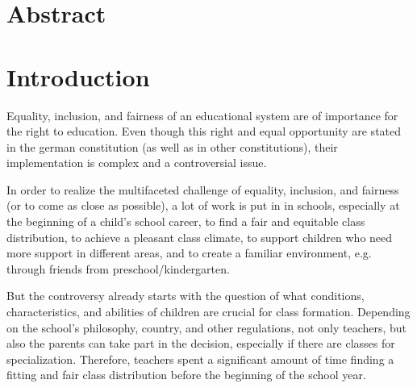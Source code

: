 






\newpage
\begin{onehalfspace}

\section*{Abstract}
\newpage
\section{Introduction}
Equality, inclusion, and fairness of an educational system are of importance 
for the right to education. Even though this right and equal opportunity are 
stated in the german constitution (as well as in other constitutions), their 
implementation is complex and a controversial issue. \citep{zhang2014equality}

In order to realize the multifaceted challenge of equality, inclusion, and fairness
 (or to come as close as possible), a lot of work is put in in schools, especially at 
 the beginning of a child's school career, to find a fair and equitable class distribution,
  to achieve a pleasant class climate, to support children who need more support in different areas, 
  and to create a familiar environment, e.g. through friends from preschool/kindergarten.

But the controversy already starts with the question of what conditions, characteristics, 
and abilities of children are crucial for class formation. Depending on the school's 
philosophy, country, and other regulations, not only teachers, but also the parents can take 
part in the decision, especially if there are classes for specialization. Therefore, teachers 
spent a significant amount of time finding a fitting and fair class distribution before the beginning
 of the school year. 
\\


\end{onehalfspace}
